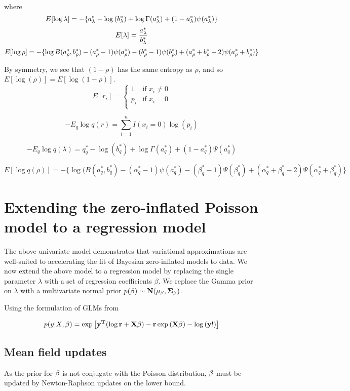 \documentclass{amsart}
\begin{document}
where
$$
E [\log{\lambda}] = -\{ a_\lambda^* - \log{(b_\lambda^*)} + \log{\Gamma(a_\lambda^*)} + (1 - a_\lambda^*) \psi{(a_\lambda^*)} \} \\
$$
$$
E [\lambda] = \frac{a_\lambda^*}{b_\lambda^*} \\
$$
$$
E[\log{\rho}] = - \{ \log{B(a_\rho^*, b_\rho^*)} - (a_\rho^* - 1) \psi{(a_\rho^*)} - (b_\rho^* - 1)\psi{(b_\rho^*)} + (a_\rho^* + b_\rho^* - 2)\psi{(a_\rho^* + b_\rho^*)} \} \\
$$

By symmetry, we see that $(1 - \rho)$ has the same entropy as $\rho$,
and so $E [\log{(\rho)}] = E [\log{(1 - \rho)}]$.
$$
E[r_i] = 
	\begin{cases}
	1 & \text{if } x_i \ne 0 \\
	p_i & \text{if } x_i = 0 \\
	\end{cases}
$$

$$
-E_q \log{q(r)} = \sum_{i=1}^n I(x_i = 0) \log{(p_i)}
$$

$$
-E_q \log{q(\lambda)} = q_q^* - \log{(b_q^*)} + \log{\Gamma{(a_q^*)}} + (1 - a_q^*) \Psi{(a_q^*)}
$$

$$
E[\log{q(\rho)}] = - \{ \log{(B(a_q^*, b_q^*)} - (\alpha_q^* - 1) \psi{(a_q^*)} - (\beta_q^* - 1)\Psi{(\beta_q^*)} + (\alpha_q^* + \beta_q^* - 2)\Psi{(\alpha_q^* + \beta_q^*)} \}
$$

\section{Extending the zero-inflated Poisson model to a regression model}
The above univariate model demonstrates that variational approximations are well-suited
to accelerating the fit of Bayesian zero-inflated models to data. We now extend the above
model to a regression model by replacing the single parameter $\lambda$ with a set of
regression coefficients $\beta$. We replace the Gamma prior on $\lambda$ with a multivariate
normal prior $p(\bf \beta) \sim N(\mu_\beta, \Sigma_\beta)$.

Using the formulation of GLMs from \cite{wand02}

$$
p(y|X, \bf \beta) = \exp{\left[ \bf y^T(\log{\bf r} + X\bf \beta) - \bf r\exp{(X\bf \beta)} - \log{(\bf y!)} \right]}
$$

\subsection{Mean field updates}
As the prior for $\bf \beta$ is not conjugate with the Poisson distribution, $\bf \beta$ must be
updated by Newton-Raphson updates on the lower bound.
\end{document}
